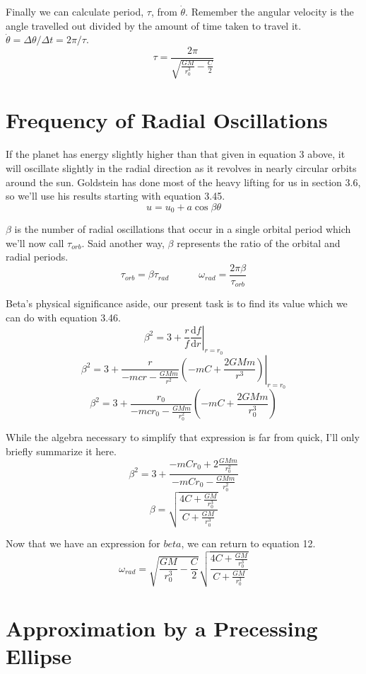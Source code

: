 \documentclass[10pt,a4paper]{article}
\begin{document}
Finally we can calculate period, $\tau$, from $\dot{\theta}$. Remember the angular velocity is the angle travelled out divided by the amount of time taken to travel it. $\dot{\theta}=\Delta\theta /\Delta t = 2\pi /\tau$.
\begin{equation}\boxed{
\tau=\frac{2\pi}{\sqrt{\frac{GM}{r_0^3}-\frac{C}{2}}}
}\end{equation}

\section{Frequency of Radial Oscillations}
If the planet has energy slightly higher than that given in equation 3 above, it will oscillate slightly in the radial direction as it revolves in nearly circular orbits around the sun.  Goldstein has done most of the heavy lifting for us in section 3.6, so we'll use his results starting with equation 3.45.
\begin{equation}
u=u_0+a\cos\beta\theta
\end{equation}

$\beta$ is the number of radial oscillations that occur in a single orbital period which we'll now call $\tau_{orb}$.  Said another way, $\beta$ represents the ratio of the orbital and radial periods.
\begin{equation}
\tau_{orb}=\beta\tau_{rad} \quad\quad\quad \omega_{rad}=\frac{2\pi\beta}{\tau_{orb}}
\end{equation}

Beta's physical significance aside, our present task is to find its value which we can do with equation 3.46.
\begin{equation}
\beta^2=3+\left.\frac{r}{f}\frac{\mathrm{d}f}{\mathrm{d}r}\right|_{r=r_0}
\end{equation}
\begin{equation}
\beta^2=3+\left.\frac{r}{-mcr-\frac{GMm}{r^2}}\left(-mC+\frac{2GMm}{r^3}\right)\right|_{r=r_0}
\end{equation}
\begin{equation}
\beta^2=3+\frac{r_0}{-mcr_0-\frac{GMm}{r_0^2}}\left(-mC+\frac{2GMm}{r_0^3}\right)
\end{equation}

While the algebra necessary to simplify that expression is far from quick, I'll only briefly summarize it here.
\begin{equation}
\beta^2=3+\frac{-mCr_0+2\frac{GMm}{r_0^2}}{-mCr_0-\frac{GMm}{r_0^2}}
\end{equation}
\begin{equation}
\beta=\sqrt{\frac{4C+\frac{GM}{r_0^3}}{C+\frac{GM}{r_0^3}}}
\end{equation}

Now that we have an expression for $beta$, we can return to equation 12.
\begin{equation}
\omega_{rad}=\sqrt{\frac{GM}{r_0^3}-\frac{C}{2}}\sqrt{\frac{4C+\frac{GM}{r_0^3}}{C+\frac{GM}{r_0^3}}}
\end{equation}

\section{Approximation by a Precessing Ellipse}
\end{document}
